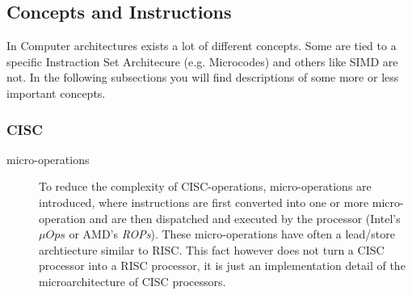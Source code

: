 \documentclass[a4paper,10pt]{article}
\begin{document}
\subsection{Concepts and Instructions}
In Computer architectures exists a lot of different concepts. Some are tied to a specific Instraction Set Architecure (e.g. Microcodes) and others like SIMD are not. In the following subsections you will find descriptions of some more or less important concepts.

\subsubsection{CISC}
\begin{description}
\item[micro-operations] To reduce the complexity of CISC-operations, micro-operations are introduced, where instructions are first converted
into one or more micro-operation and are then dispatched and executed by the processor (Intel's $\mu Ops$ or AMD's \emph{ROPs}). These micro-operations have often a lead/store archtiecture similar to RISC. This fact however does not turn a CISC processor
into a RISC processor, it is just an implementation detail of the microarchitecture of CISC processors.
\end{description}
\end{document}
